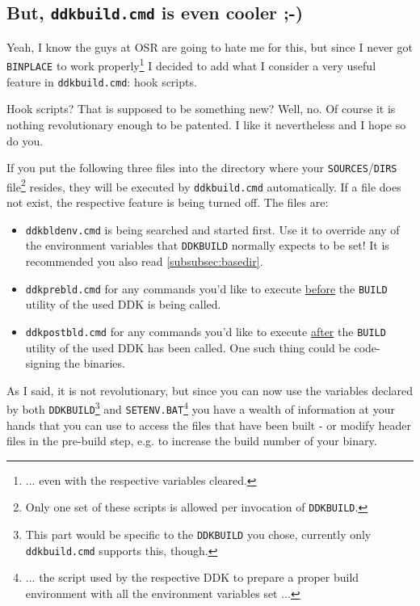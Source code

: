 \documentclass[a4paper,titlepage]{report}
\begin{document}
\subsection{But, \texttt{ddkbuild.cmd} is even cooler \textsf{;-)}}
\label{subsec:buildscripts}
Yeah, I know the guys at OSR are going to hate me for this, but since I never got \texttt{BINPLACE}
to work properly\footnote{... even with the respective variables cleared.} I decided to
add what I consider a very useful feature in \texttt{ddkbuild.cmd}: hook scripts.

Hook scripts? That is supposed to be something new? Well, no. Of course it is nothing
revolutionary enough to be patented. I like it nevertheless and I hope so do you.

If you put the following three files into the directory where your \texttt{SOURCES}/\texttt{DIRS}
file\footnote{Only one set of these scripts is allowed per invocation of \texttt{DDKBUILD}.}
resides, they will be executed by \texttt{ddkbuild.cmd} automatically.
If a file does not exist, the respective feature is being turned off. The files are:
\begin{itemize}
  \item \texttt{ddkbldenv.cmd} is being searched and started first. Use it to override any of the environment
  variables that \texttt{DDKBUILD} normally expects to be set! It is recommended you also read \autoref{subsubsec:basedir}.
  \item \texttt{ddkprebld.cmd} for any commands you'd like to execute \underline{before} the \texttt{BUILD}
  utility of the used DDK is being called.
  \item \texttt{ddkpostbld.cmd} for any commands you'd like to execute \underline{after} the \texttt{BUILD}
  utility of the used DDK has been called. One such thing could be code-signing the binaries.
\end{itemize}

As I said, it is not revolutionary, but since you can now use the variables declared by both
\texttt{DDKBUILD}\footnote{This part would be specific to the \texttt{DDKBUILD} you chose,
currently only \texttt{ddkbuild.cmd} supports this, though.} and \texttt{SETENV.BAT}\footnote{... the
script used by the respective DDK to prepare a proper build environment with all the
environment variables set ...} you have a wealth of information at your hands that
you can use to access the files that have been built - or modify header files in the
pre-build step, e.g. to increase the build number of your binary.
\end{document}
